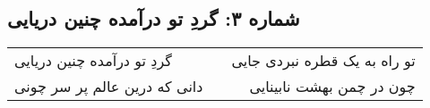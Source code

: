 \begin{center}
\section*{شماره ۳: گردِ تو درآمده چنین دریایی}
\label{sec:003}
\begin{longtable}{l p{0.5cm} r}
گردِ تو درآمده چنین دریایی
&&
تو راه به یک قطره نبردی جایی
\\
دانی که درین عالم پر سر چونی
&&
 چون در چمن بهشت نابینایی
\\
\end{longtable}
\end{center}
